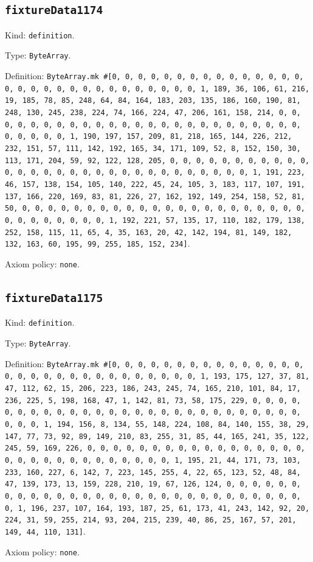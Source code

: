 \documentclass[11pt]{article}
\begin{document}
\subsection*{\texttt{fixtureData1174}}
\noindent Kind: \texttt{definition}.\par
\noindent Type: \texttt{ByteArray}.\par
\noindent Definition: \texttt{ByteArray.mk \#[0, 0, 0, 0, 0, 0, 0, 0, 0, 0, 0, 0, 0, 0, 0, 0, 0, 0, 0, 0, 0, 0, 0, 0, 0, 0, 0, 0, 0, 0, 1, 189, 36, 106, 61, 216, 19, 185, 78, 85, 248, 64, 84, 164, 183, 203, 135, 186, 160, 190, 81, 248, 130, 245, 238, 224, 74, 166, 224, 47, 206, 161, 158, 214, 0, 0, 0, 0, 0, 0, 0, 0, 0, 0, 0, 0, 0, 0, 0, 0, 0, 0, 0, 0, 0, 0, 0, 0, 0, 0, 0, 0, 0, 0, 1, 190, 197, 157, 209, 81, 218, 165, 144, 226, 212, 232, 151, 57, 111, 142, 192, 165, 34, 171, 109, 52, 8, 152, 150, 30, 113, 171, 204, 59, 92, 122, 128, 205, 0, 0, 0, 0, 0, 0, 0, 0, 0, 0, 0, 0, 0, 0, 0, 0, 0, 0, 0, 0, 0, 0, 0, 0, 0, 0, 0, 0, 0, 0, 1, 191, 223, 46, 157, 138, 154, 105, 140, 222, 45, 24, 105, 3, 183, 117, 107, 191, 137, 166, 220, 169, 83, 81, 226, 27, 162, 192, 149, 254, 158, 52, 81, 50, 0, 0, 0, 0, 0, 0, 0, 0, 0, 0, 0, 0, 0, 0, 0, 0, 0, 0, 0, 0, 0, 0, 0, 0, 0, 0, 0, 0, 0, 0, 1, 192, 221, 57, 135, 17, 110, 182, 179, 138, 252, 158, 115, 11, 65, 4, 35, 163, 20, 42, 142, 194, 81, 149, 182, 132, 163, 60, 195, 99, 255, 185, 152, 234]}.\par
\noindent Axiom policy: \texttt{none}.\par
\subsection*{\texttt{fixtureData1175}}
\noindent Kind: \texttt{definition}.\par
\noindent Type: \texttt{ByteArray}.\par
\noindent Definition: \texttt{ByteArray.mk \#[0, 0, 0, 0, 0, 0, 0, 0, 0, 0, 0, 0, 0, 0, 0, 0, 0, 0, 0, 0, 0, 0, 0, 0, 0, 0, 0, 0, 0, 0, 1, 193, 175, 127, 37, 81, 47, 112, 62, 15, 206, 223, 186, 243, 245, 74, 165, 210, 101, 84, 17, 236, 225, 5, 198, 168, 47, 1, 142, 81, 73, 58, 175, 229, 0, 0, 0, 0, 0, 0, 0, 0, 0, 0, 0, 0, 0, 0, 0, 0, 0, 0, 0, 0, 0, 0, 0, 0, 0, 0, 0, 0, 0, 0, 1, 194, 156, 8, 134, 55, 148, 224, 108, 84, 140, 155, 38, 29, 147, 77, 73, 92, 89, 149, 210, 83, 255, 31, 85, 44, 165, 241, 35, 122, 245, 59, 169, 226, 0, 0, 0, 0, 0, 0, 0, 0, 0, 0, 0, 0, 0, 0, 0, 0, 0, 0, 0, 0, 0, 0, 0, 0, 0, 0, 0, 0, 0, 0, 1, 195, 21, 44, 171, 73, 103, 233, 160, 227, 6, 142, 7, 223, 145, 255, 4, 22, 65, 123, 52, 48, 84, 47, 139, 173, 13, 159, 228, 210, 19, 67, 126, 124, 0, 0, 0, 0, 0, 0, 0, 0, 0, 0, 0, 0, 0, 0, 0, 0, 0, 0, 0, 0, 0, 0, 0, 0, 0, 0, 0, 0, 0, 0, 1, 196, 237, 107, 164, 193, 187, 25, 61, 173, 41, 243, 142, 92, 20, 224, 31, 59, 255, 214, 93, 204, 215, 239, 40, 86, 25, 167, 57, 201, 149, 44, 110, 131]}.\par
\noindent Axiom policy: \texttt{none}.\par
\end{document}

